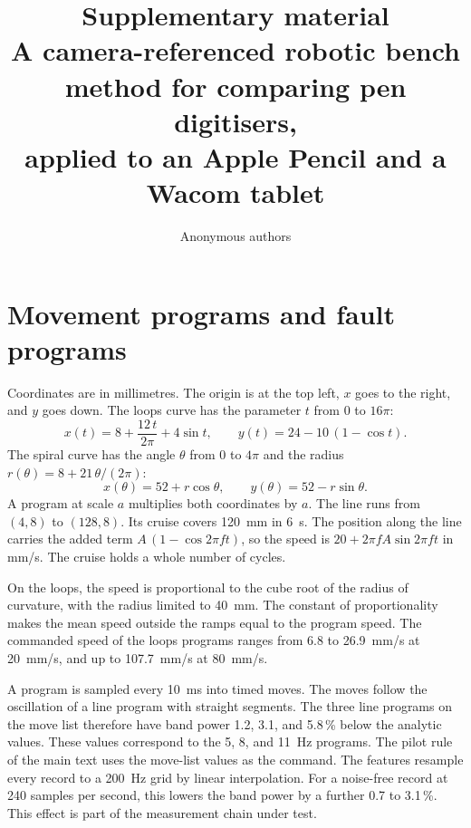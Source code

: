 \documentclass[11pt,a4paper]{article}
\title{Supplementary material\\
\large A camera-referenced robotic bench method for comparing pen digitisers,\\ applied to an Apple Pencil and a Wacom tablet}
\author{Anonymous authors}
\date{}
\begin{document}
\maketitle

\section{Movement programs and fault programs}
\label{sec:s-programs}
Coordinates are in millimetres.
The origin is at the top left, $x$ goes to the right, and $y$ goes down.
The loops curve has the parameter $t$ from 0 to $16\pi$:
\begin{equation}
x(t)=8+\frac{12\,t}{2\pi}+4\sin t,\qquad y(t)=24-10\,(1-\cos t).
\end{equation}
The spiral curve has the angle $\theta$ from 0 to $4\pi$ and the radius $r(\theta)=8+21\,\theta/(2\pi)$:
\begin{equation}
x(\theta)=52+r\cos\theta,\qquad y(\theta)=52-r\sin\theta.
\end{equation}
A program at scale $a$ multiplies both coordinates by $a$.
The line runs from $(4,8)$ to $(128,8)$.
Its cruise covers 120~mm in 6~s.
The position along the line carries the added term $A\,(1-\cos 2\pi f t)$, so the speed is $20+2\pi f A\sin 2\pi f t$ in mm/s.
The cruise holds a whole number of cycles.

On the loops, the speed is proportional to the cube root of the radius of curvature, with the radius limited to 40~mm.
The constant of proportionality makes the mean speed outside the ramps equal to the program speed.
The commanded speed of the loops programs ranges from 6.8 to 26.9~mm/s at 20~mm/s, and up to 107.7~mm/s at 80~mm/s.

A program is sampled every 10~ms into timed moves.
The moves follow the oscillation of a line program with straight segments.
The three line programs on the move list therefore have band power 1.2, 3.1, and 5.8\,\% below the analytic values.
These values correspond to the 5, 8, and 11~Hz programs.
The pilot rule of the main text uses the move-list values as the command.
The features resample every record to a 200~Hz grid by linear interpolation.
For a noise-free record at 240 samples per second, this lowers the band power by a further 0.7 to 3.1\,\%.
This effect is part of the measurement chain under test.
\end{document}
